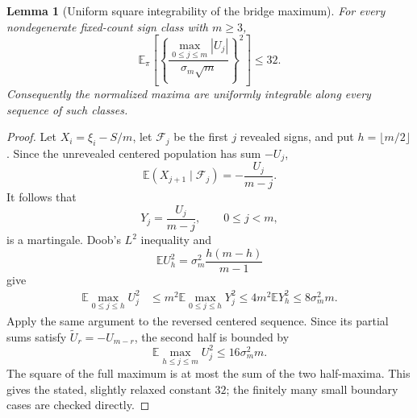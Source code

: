\documentclass[11pt,reqno]{amsart}
\numberwithin{equation}{section}
\theoremstyle{plain}
\newtheorem{lemma}[theorem]{Lemma}
\theoremstyle{definition}
\theoremstyle{remark}
\newcommand{\E}{\mathbb E}
\begin{document}
\begin{lemma}[Uniform square integrability of the bridge maximum]
\label{lem:bridge-maximum-ui}
For every nondegenerate fixed-count sign class with \(m\geq3\),
\begin{equation}
\E_{\pi}\left[
\left\{\frac{\max_{0\leq j\leq m}|U_j|}
{\sigma_m\sqrt m}\right\}^{\!2}\right]
\leq32.
\label{eq:bridge-maximum-l2-bound}
\end{equation}
Consequently the normalized maxima are uniformly integrable along every
sequence of such classes.
\end{lemma}

\begin{proof}
Let \(X_i=\xi_i-S/m\), let \(\mathcal F_j\) be the first \(j\) revealed
signs, and put \(h=\lfloor m/2\rfloor\).  Since the unrevealed centered
population has sum \(-U_j\),
\begin{equation}
\E(X_{j+1}\mid\mathcal F_j)=-\frac{U_j}{m-j}.
\label{eq:bridge-conditional-drift}
\end{equation}
It follows that
\begin{equation}
Y_j=\frac{U_j}{m-j},\qquad 0\leq j<m,
\label{eq:bridge-doob-martingale}
\end{equation}
is a martingale.  Doob's \(L^2\) inequality and
\begin{equation}
\E U_h^2=\sigma_m^2\frac{h(m-h)}{m-1}
\label{eq:finite-bridge-variance}
\end{equation}
give
\begin{align}
\E\max_{0\leq j\leq h}U_j^2
&\leq m^2\E\max_{0\leq j\leq h}Y_j^2
\leq4m^2\E Y_h^2
\leq8\sigma_m^2m.
\label{eq:first-half-maximal-bound}
\end{align}
Apply the same argument to the reversed centered sequence.  Since its partial
sums satisfy \(\widetilde U_r=-U_{m-r}\), the second half is bounded by
\begin{equation}
\E\max_{h\leq j\leq m}U_j^2\leq16\sigma_m^2m.
\label{eq:second-half-maximal-bound}
\end{equation}
The square of the full maximum is at most the sum of the two half-maxima.
This gives the stated, slightly relaxed constant \(32\); the finitely many
small boundary cases are checked directly.
\end{proof}
\end{document}
